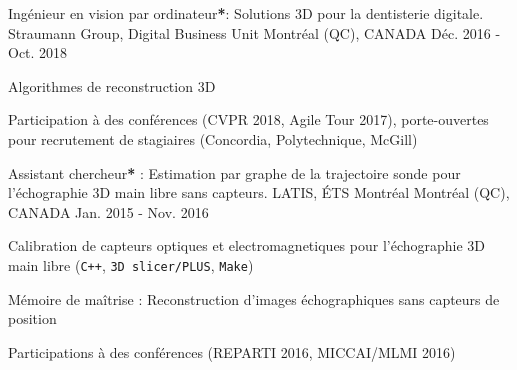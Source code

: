 \begin{cventries}

\cventry
{Ingénieur en vision par ordinateur\textbf{*}: Solutions 3D pour la dentisterie digitale.}%
{Straumann Group, Digital Business Unit} %
{\hspace{-5mm}Montréal (QC), CANADA} %
{Déc. 2016 - Oct. 2018} %
{ %
\begin{cvitems}
\item {Algorithmes de reconstruction 3D}
\item {Participation à des conférences (CVPR 2018, Agile Tour 2017), porte-ouvertes pour recrutement de stagiaires (Concordia, Polytechnique, McGill)}
\end{cvitems}
}


\cventry
{Assistant chercheur\textbf{*} : Estimation par graphe de la trajectoire sonde pour l'échographie 3D main libre sans capteurs.}%
{LATIS, ÉTS Montréal} %
{\hspace{-5mm}Montréal (QC), CANADA} %
{Jan. 2015 - Nov. 2016} %
{ %
\begin{cvitems}
\item {Calibration de capteurs optiques et electromagnetiques pour l'échographie 3D main libre (\texttt{C++}, \texttt{3D slicer/PLUS}, \texttt{Make})}
\item {Mémoire de maîtrise \cite{tetrel2016estimation}: Reconstruction d'images échographiques sans capteurs de position}
\item {Participations à des conférences (REPARTI 2016, MICCAI/MLMI 2016)}
\end{cvitems}
}


\end{cventries}
